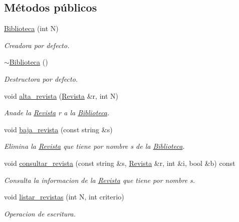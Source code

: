 \subsection*{Métodos públicos}
\begin{DoxyCompactItemize}
\item 
\hyperlink{class_biblioteca_a021f69adcc57a5d04e6e12532a684e2b}{Biblioteca} (int N)
\begin{DoxyCompactList}\small\item\em Creadora por defecto. \end{DoxyCompactList}\item 
\hyperlink{class_biblioteca_ae3f55e8952ed4bdddb82ece48c52f6c0}{$\sim$\-Biblioteca} ()
\begin{DoxyCompactList}\small\item\em Destructora por defecto. \end{DoxyCompactList}\item 
void \hyperlink{class_biblioteca_a3a699f219da645b8c461d1d07dbf6c76}{alta\-\_\-revista} (\hyperlink{class_revista}{Revista} \&r, int N)
\begin{DoxyCompactList}\small\item\em Anade la \hyperlink{class_revista}{Revista} r a la \hyperlink{class_biblioteca}{Biblioteca}. \end{DoxyCompactList}\item 
void \hyperlink{class_biblioteca_a3a5acce11e50bd1c262dabe293567b48}{baja\-\_\-revista} (const string \&s)
\begin{DoxyCompactList}\small\item\em Elimina la \hyperlink{class_revista}{Revista} que tiene por nombre s de la \hyperlink{class_biblioteca}{Biblioteca}. \end{DoxyCompactList}\item 
void \hyperlink{class_biblioteca_a44e062939e33e5da4743da5197b971f7}{consultar\-\_\-revista} (const string \&s, \hyperlink{class_revista}{Revista} \&r, int \&i, bool \&b) const 
\begin{DoxyCompactList}\small\item\em Consulta la informacion de la \hyperlink{class_revista}{Revista} que tiene por nombre s. \end{DoxyCompactList}\item 
void \hyperlink{class_biblioteca_a1560e54ae8e81b7c0190b636278af7b5}{listar\-\_\-revistas} (int N, int criterio)
\begin{DoxyCompactList}\small\item\em Operacion de escritura. \end{DoxyCompactList}\end{DoxyCompactItemize}
